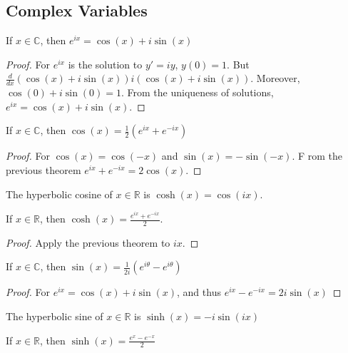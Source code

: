             \subsection{Complex Variables}
            \begin{theorem}
            If $x\in\mathbb{C}$, then $e^{ix}=\cos(x)+i\sin(x)$
            \end{theorem}
            \begin{proof}
            For $e^{ix}$ is the solution to $y'=iy$, $y(0)=1$. But $\frac{d}{dx}(\cos(x)+i\sin(x))i(\cos(x)+i\sin(x))$. Moreover, $\cos(0)+i\sin(0)=1$. From the uniqueness of solutions, $e^{ix}=\cos(x)+i\sin(x)$. 
            \end{proof}
            \begin{theorem}
            If $x\in \mathbb{C}$, then $\cos(x)=\frac{1}{2}(e^{ix}+e^{-ix})$
            \end{theorem}
            \begin{proof}
            For $\cos(x)=\cos(-x)$ and $\sin(x)=-\sin(-x)$. F rom the previous theorem $e^{ix}+e^{-ix} = 2\cos(x)$.
            \end{proof}
            \begin{definition}
            The hyperbolic cosine of $x\in \mathbb{R}$ is $\cosh(x)=\cos(ix)$.
            \end{definition}
            \begin{theorem}
            If $x\in\mathbb{R}$, then $\cosh(x)=\frac{e^{ix}+e^{-ix}}{2}$.
            \end{theorem}
            \begin{proof}
            Apply the previous theorem to $ix$.
            \end{proof}
            \begin{theorem}
            If $x\in\mathbb{C}$, then $\sin(x)=\frac{1}{2i}(e^{i\theta}-e^{i\theta})$
            \end{theorem}
            \begin{proof}
            For $e^{ix} = \cos(x)+i\sin(x)$, and thus $e^{ix}-e^{-ix}=2i\sin(x)$
            \end{proof}
            \begin{definition}
            The hyperbolic sine of $x\in\mathbb{R}$ is $\sinh(x)=-i\sin(ix)$
            \end{definition}
            \begin{theorem}
            If $x\in\mathbb{R}$, then $\sinh(x)=\frac{e^{x}-e^{-x}}{2}$
            \end{theorem}
